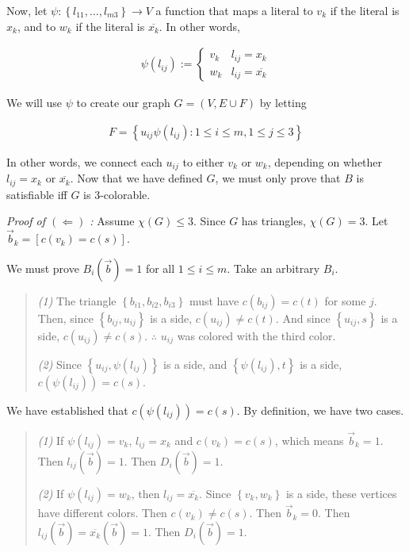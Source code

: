 Now, let $\psi : \left\{ l_{11}, \ldots, l_{m3} \right\} \to V$ a function that maps a literal to $v_k$ if the literal is $x_k$, and to $w_k$ if the literal is $\overline{x_k}$. In other words, 

\begin{align*}
    \psi(l_{ij}) := \begin{cases}
        v_k & l_{ij} = x_k \\ 
        w_k & l_{ij} = \overline{x_k}
    \end{cases}
\end{align*}


We will use $\psi$ to create our graph $G = (V, E \cup F)$ by letting


\begin{align*}
    F = \left\{ u_{ij}\psi(l_{ij}) : 1 \leq i \leq m, 1 \leq j \leq 3 \right\} 
\end{align*}

In other words, we connect each $u_{ij}$ to either $v_k$ or $w_k$, depending 
on whether $l_{ij} = x_k$ or $\overline{x_k}$. Now that we have defined 
$G$, we must only prove that $B$ is satisfiable iff $G$ is $3$-colorable.

\textit{Proof of $(\Leftarrow)$ :} Assume $\chi(G) \leq 3$. Since $G$ has
triangles, $\chi(G) = 3$. Let $\overrightarrow{b}_k = \left[ c(v_k) = c(s)
\right] $.

We must prove $B_i(\overrightarrow{b}) = 1$ for all $1 \leq i \leq m$. Take an
arbitrary $B_i$. 


\begin{quote}

\textit{(1)} The triangle $\left\{ b_{i1}, b_{i 2}, b_{i 3} \right\} $
must have $c(b_{ij}) = c(t)$ for some $j$. Then, since $\left\{ b_{ij}, u_{ij}
\right\} $ is a side, $c(u_{ij}) \neq c(t)$. And since $\left\{ u_{ij}, s
\right\} $ is a side, $c(u_{ij}) \neq c(s)$. $\therefore $ $u_{ij}$ was
colored with the third color.

\textit{(2)} Since $\left\{ u_{ij}, \psi(l_{ij}) \right\} $ is a side, and
$\left\{ \psi(l_{ij}), t \right\} $ is a side, $c(\psi(l_{ij})) = c(s)$.

\end{quote}

We have established that $c(\psi(l_{ij})) = c(s)$. By definition, we have two
cases. 

\begin{quote}
    \textit{(1)} If $\psi(l_{ij}) = v_k$, $l_{ij} = x_k$ and $c(v_k) = c(s)$, which means $\overrightarrow{b}_k = 1$. Then $l_{ij}(\overrightarrow{b}) = 1$. Then $D_i(\overrightarrow{b}) = 1$.

    \textit{(2)} If $\psi(l_{ij}) = w_k$, then $l_{ij} = \overline{x_k}$. Since $\left\{ v_k, w_k \right\} $ is a side, these vertices have different colors. Then $c(v_k) \neq c(s)$. Then $\overrightarrow{b}_k = 0$. Then $l_{ij}(\overrightarrow{b}) = \overline{x_k}(\overrightarrow{b}) = 1$. Then $D_i(\overrightarrow{b}) = 1$.
\end{quote}

